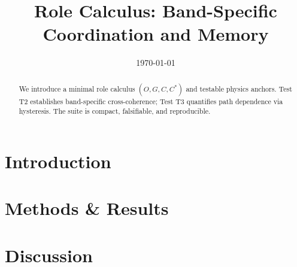 \documentclass[11pt,a4paper]{article}
\title{Role Calculus: Band-Specific Coordination and Memory}
\author{}
\date{\today}
\begin{document}
\maketitle

\begin{abstract}
We introduce a minimal role calculus $(O,G,C,C^\ast)$ and testable physics anchors.
Test T2 establishes band-specific cross-coherence; Test T3 quantifies path dependence via hysteresis.
The suite is compact, falsifiable, and reproducible.
\end{abstract}

\section{Introduction}



\section{Methods \& Results}




% 

\section{Discussion}



\end{document}
